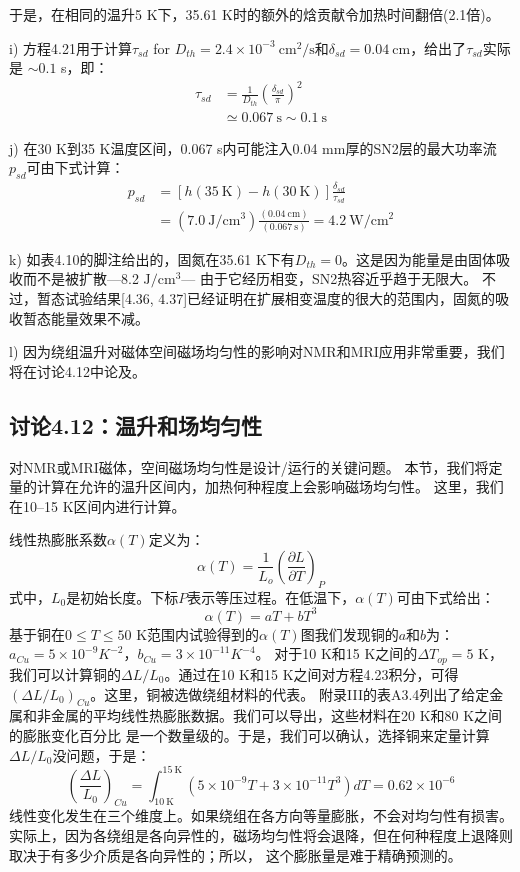 于是，在相同的温升5 K下，35.61 K时的额外的焓贡献令加热时间翻倍(2.1倍)。

i) 方程4.21用于计算$\tau_{sd}$ for $D_{th} = 2.4\times 10^{−3} \ \mathrm{cm^2/s}$和$\delta_{sd}=0.04\ \mathrm{cm}$，给出了$\tau_{sd}$实际是 $\sim 0.1$ s，即：
\begin{align*}%
\tau_{sd}&=\frac{1}{D_{th}}(\frac{\delta_{sd}}{\pi})^2 \\\tag{4.21}
&\simeq 0.067\ \mathrm{s}\sim 0.1\ \mathrm{s}
\end{align*}

j) 在30 K到35 K温度区间，0.067 s内可能注入0.04 mm厚的SN2层的最大功率流$p_{sd}$可由下式计算：
\begin{align*}%
p_{sd}&=[h(35\ \mathrm{K})-h(30\ \mathrm{K})]\frac{\delta_{sd}}{\tau_{sd}}\\
&=(7.0\ \mathrm{J/cm^3})\frac{(0.04\ \mathrm{cm})}{(0.067\ \mathrm{s})}=4.2 \ \mathrm{W/cm^2}
\end{align*}

k) 如表4.10的脚注给出的，固氮在35.61 K下有$D_{th} = 0$。这是因为能量是由固体吸收而不是被扩散---8.2 $\mathrm{J/cm^3}$---
由于它经历相变，SN2热容近乎趋于无限大。
不过，暂态试验结果[4.36, 4.37]已经证明在扩展相变温度的很大的范围内，固氮的吸收暂态能量效果不减。

l) 因为绕组温升对磁体空间磁场均匀性的影响对NMR和MRI应用非常重要，我们将在讨论4.12中论及。



\subsection{讨论4.12：温升和场均匀性}
对NMR或MRI磁体，空间磁场均匀性是设计/运行的关键问题。
本节，我们将定量的计算在允许的温升区间内，加热何种程度上会影响磁场均匀性。
这里，我们在10–15 K区间内进行计算。

线性热膨胀系数$\alpha(T)$定义为：
\begin{equation}%
\alpha(T)=\frac{1}{L_o}(\frac{\partial L}{\partial T})_P
\end{equation}
式中，$L_0$是初始长度。下标$P$表示等压过程。在低温下，$\alpha(T)$可由下式给出：
\begin{equation}%
\alpha(T)=aT+bT^3
\end{equation}
基于铜在$0\le T\le 50$ K范围内试验得到的$\alpha(T)$图我们发现铜的$a$和$b$为：
$a_{Cu}= 5\times 10^{-9} K^{−2}$，$b_{Cu} = 3\times 10^{−11} K^{−4}$。
对于10 K和15 K之间的$\Delta T_{op} = 5$ K，我们可以计算铜的$\Delta L/L_0$。通过在10 K和15 K之间对方程4.23积分，可得
$(\Delta L/L_0)_{Cu}$。这里，铜被选做绕组材料的代表。
附录III的表A3.4列出了给定金属和非金属的平均线性热膨胀数据。我们可以导出，这些材料在20 K和80 K之间的膨胀变化百分比
是一个数量级的。于是，我们可以确认，选择铜来定量计算$\Delta L/L_0$没问题，于是：
\begin{equation}%
\left(\frac{\Delta L}{L_0}\right)_{Cu}=\int_{10\ \mathrm{K}}^{15\ \mathrm{K}}(5\times 10^{-9}T+3\times 10^{-11}T^3)dT=0.62\times 10^{-6}
\end{equation}
线性变化发生在三个维度上。如果绕组在各方向等量膨胀，不会对均匀性有损害。
实际上，因为各绕组是各向异性的，磁场均匀性将会退降，但在何种程度上退降则取决于有多少介质是各向异性的；所以，
这个膨胀量是难于精确预测的。

